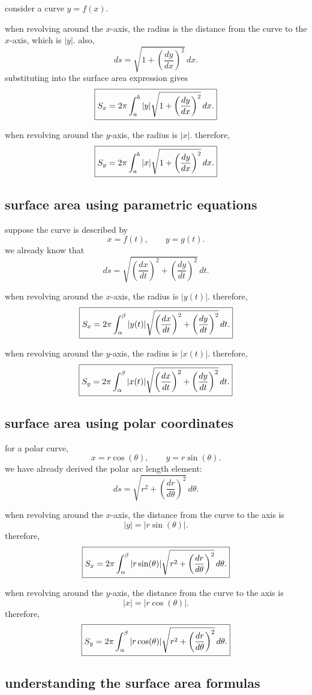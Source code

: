 \documentclass{article}
\newcommand{\mybox}[1]{\fbox{\ensuremath{\displaystyle #1}}}
\begin{document}
consider a curve $y=f(x)$.

when revolving around the $x$-axis, the radius is the distance from the curve to the $x$-axis, which is $|y|$. also,
\[
ds=\sqrt{1+\left(\frac{dy}{dx}\right)^2}\,dx.
\]
substituting into the surface area expression gives
\[
\mybox{
S_x=
2\pi\int_a^b
|y|\sqrt{1+\left(\frac{dy}{dx}\right)^2}\,dx.
}
\]

when revolving around the $y$-axis, the radius is $|x|$. therefore,
\[
\mybox{
S_y=
2\pi\int_a^b
|x|\sqrt{1+\left(\frac{dy}{dx}\right)^2}\,dx.
}
\]

\subsection{surface area using parametric equations}

suppose the curve is described by
\[
x=f(t),\qquad y=g(t).
\]
we already know that
\[
ds=
\sqrt{
\left(\frac{dx}{dt}\right)^2+
\left(\frac{dy}{dt}\right)^2
}\,dt.
\]

when revolving around the $x$-axis, the radius is $|y(t)|$. therefore,
\[
\mybox{
S_x=
2\pi\int_\alpha^\beta
|y(t)|
\sqrt{
\left(\frac{dx}{dt}\right)^2+
\left(\frac{dy}{dt}\right)^2
}\,dt.
}
\]

when revolving around the $y$-axis, the radius is $|x(t)|$. therefore,
\[
\mybox{
S_y=
2\pi\int_\alpha^\beta
|x(t)|
\sqrt{
\left(\frac{dx}{dt}\right)^2+
\left(\frac{dy}{dt}\right)^2
}\,dt.
}
\]

\subsection{surface area using polar coordinates}

for a polar curve,
\[
x=r\cos(\theta),\qquad
y=r\sin(\theta).
\]
we have already derived the polar arc length element:
\[
ds=
\sqrt{
r^2+\left(\frac{dr}{d\theta}\right)^2
}\,d\theta.
\]

when revolving around the $x$-axis, the distance from the curve to the axis is
\[
|y|=|r\sin(\theta)|.
\]
therefore,
\[
\mybox{
S_x=
2\pi\int_\alpha^\beta
|r\sin(\theta)|
\sqrt{
r^2+\left(\frac{dr}{d\theta}\right)^2
}\,d\theta.
}
\]

when revolving around the $y$-axis, the distance from the curve to the axis is
\[
|x|=|r\cos(\theta)|.
\]
therefore,
\[
\mybox{
S_y=
2\pi\int_\alpha^\beta
|r\cos(\theta)|
\sqrt{
r^2+\left(\frac{dr}{d\theta}\right)^2
}\,d\theta.
}
\]

\subsection{understanding the surface area formulas}
\end{document}
